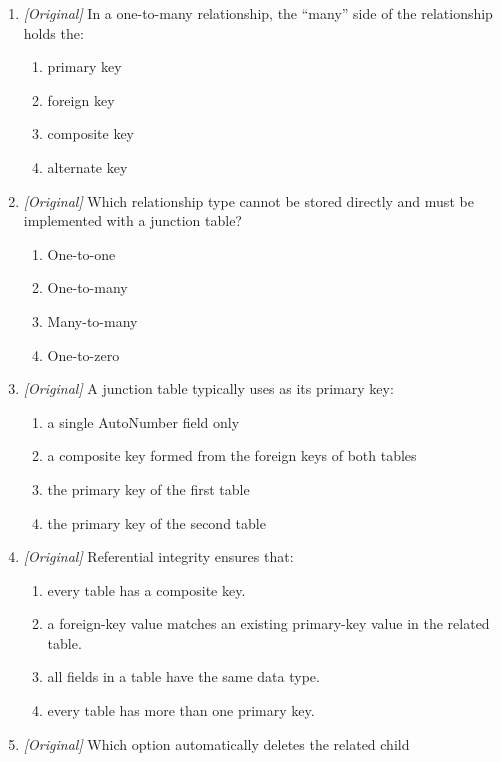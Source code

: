 \begin{enumerate}[label=\textbf{Q\arabic*.}, leftmargin=*]
\begin{enumerate}[label=\Alph*.]
    \item Many-to-many
    \item Zero-to-one
  \end{enumerate}
\item \textit{[Original]} In a one-to-many relationship, the ``many'' side of
  the relationship holds the:
  \begin{enumerate}[label=\Alph*.]
    \item primary key
    \item foreign key
    \item composite key
    \item alternate key
  \end{enumerate}
\item \textit{[Original]} Which relationship type cannot be stored directly
  and must be implemented with a junction table?
  \begin{enumerate}[label=\Alph*.]
    \item One-to-one
    \item One-to-many
    \item Many-to-many
    \item One-to-zero
  \end{enumerate}
\item \textit{[Original]} A junction table typically uses as its primary key:
  \begin{enumerate}[label=\Alph*.]
    \item a single AutoNumber field only
    \item a composite key formed from the foreign keys of both tables
    \item the primary key of the first table
    \item the primary key of the second table
  \end{enumerate}
\item \textit{[Original]} Referential integrity ensures that:
  \begin{enumerate}[label=\Alph*.]
    \item every table has a composite key.
    \item a foreign-key value matches an existing primary-key value in the
      related table.
    \item all fields in a table have the same data type.
    \item every table has more than one primary key.
  \end{enumerate}
\item \textit{[Original]} Which option automatically deletes the related child

\end{enumerate}
